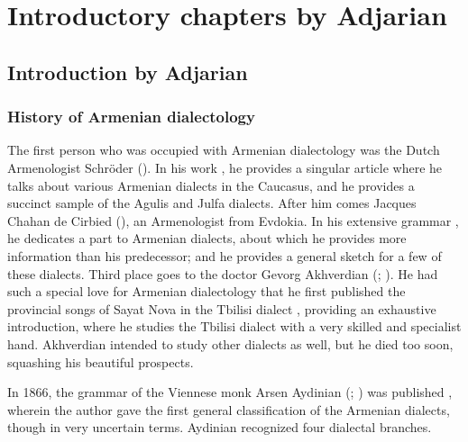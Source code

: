 \part{Introductory chapters by Adjarian}

 





\chapter{Introduction by Adjarian}




\section{History of Armenian dialectology}
\begin{adjarianpage}\label{page:1}\end{adjarianpage}%

The first person who was occupied with Armenian dialectology was the Dutch Armenologist Schröder (). In his work \citep{Shroder-1711-TheasauresArmenian}, he provides a singular article where he talks about various Armenian dialects in the Caucasus, and he provides a succinct sample of the Agulis and Julfa dialects. After him comes Jacques Chahan de Cirbied (), an Armenologist from Evdokia. In his extensive grammar \citep{Cirbied-1823-GrammarArmenian}, he dedicates a part to Armenian dialects, about which he provides more information than his predecessor; and he provides a general sketch for a few of these dialects. Third place goes to the doctor Gevorg Akhverdian (; ). He had such a special love for Armenian dialectology that he first published the provincial songs of Sayat Nova in the Tbilisi dialect \citep{SayatNova}, providing an exhaustive introduction, where he studies the Tbilisi dialect with a very skilled and specialist hand. Akhverdian intended to study other dialects as well, but he died too soon, squashing his beautiful prospects. 

In 1866, the grammar of the Viennese monk Arsen Aydinian (; ) was published \citep{Aydnian-1867-GrammarArmenian}, wherein the author gave the first general classification of the Armenian dialects, though in very uncertain terms. Aydinian recognized four dialectal branches. 




